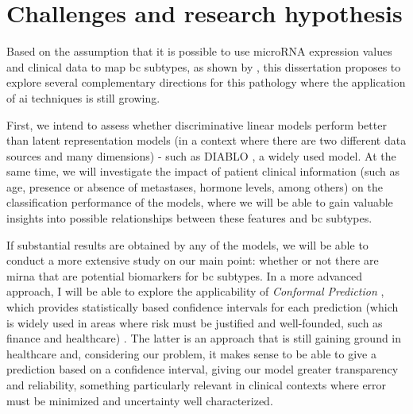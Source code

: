\section{Challenges and research hypothesis}
\label{sec:challenges+research-hypothesis}
Based on the assumption that it is possible to use microRNA expression values
and clinical data to map \gls{bc} subtypes, as shown by
\textcites{mirna_as_biomarkers_Ho2022}{mirnas_in_bc_Muñoz2023}, this dissertation
proposes to explore several complementary directions for this pathology where
the application of \gls{ai} techniques is still growing.

First, we intend to assess whether discriminative linear models perform better
than latent representation models (in a context where there are two different
data sources and many dimensions) - such as DIABLO \cite{DIABLO_Singh2019}, a
widely used model. At the same time, we will investigate the impact of patient
clinical information (such as age, presence or absence of metastases, hormone
levels, among others) on the classification performance of the models, where we
will be able to gain valuable insights into possible relationships between
these features and \gls{bc} subtypes.

If substantial results are obtained by any of the models, we will be able to
conduct a more extensive study on our main point: whether or not there are
\gls{mirna} that are potential biomarkers for \gls{bc} subtypes. In a more
advanced approach, I will be able to explore the applicability of
\textit{Conformal Prediction} \cite{conformal_prediction_Angelopoulos2023},
which provides statistically based confidence intervals for each prediction
(which is widely used in areas where risk must be justified and well-founded,
such as finance and healthcare) \cite{conformal_prediction_Angelopoulos2023}.
The latter is an approach that is still gaining ground in healthcare and,
considering our problem, it makes sense to be able to give a prediction based
on a confidence interval, giving our model greater transparency and
reliability, something particularly relevant in clinical contexts where error
must be minimized and uncertainty well characterized.

